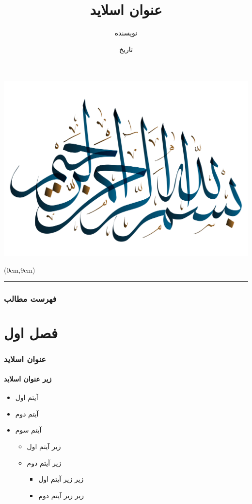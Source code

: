 \documentclass[babel={layout=lists},9pt]{beamer-rl}
\title{عنوان اسلاید}
\author{نویسنده}
\institute{نام دانشگاه}
\date{تاریخ}
\newcommand\crule[3][black]{\textcolor{#1}{\rule{#2}{#3}}}
\begin{document}
	
	
	\begin{frame}
		\includegraphics[width=7 cm]{assets/Besmellah.png}
		\begin{textblock*}{13cm}(0cm,9cm)
			\crule[MSUgreen]{13cm}{1cm}
		\end{textblock*}
	\end{frame}
	
	
	
	\begin{frame}
		\maketitle
	\end{frame}
	\begin{frame}
		\frametitle{فهرست مطالب}
		\hfill
		\parbox[t]{.95\textwidth}{
			{
				\setcounter{tocdepth}{1} 
				\tableofcontents
			}
		}
	\end{frame}
	
	
	
	\section{فصل اول}
	
	
	\begin{frame}
		\frametitle{عنوان اسلاید}
		\framesubtitle{زیر عنوان اسلاید}
		\begin{itemize}
			\setlength\itemsep{1em} %
			\item آیتم اول
			\item آیتم دوم
			\item آیتم سوم
			\vspace{0.5em} %
			\begin{itemize}
				\setlength\itemsep{1em}
				\item زیر آیتم اول
				\item زیر آیتم دوم
				\vspace{0.5em} %
				\begin{itemize}
					\setlength\itemsep{1em}
					\item زیر زیر آیتم اول
					\item زیر زیر آیتم دوم
				\end{itemize}
			\end{itemize}
		\end{itemize}
	\end{frame}
	
\end{document}
